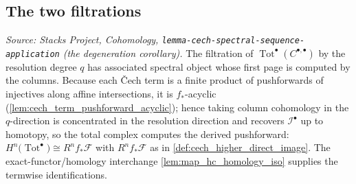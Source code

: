\subsection{The two filtrations}

\begin{lemma}
  \label{lem:total_complex_first_filtration_degenerates}
  \textit{Source: Stacks Project, Cohomology,
  \texttt{lemma-cech-spectral-sequence-application} (the degeneration corollary).}
  The filtration of \(\operatorname{Tot}^\bullet(C^{\bullet,\bullet})\) by the
  resolution degree \(q\) has associated spectral object whose first page is computed
  by the columns. Because each {\v C}ech term is a finite product of pushforwards of
  injectives along affine intersections, it is \(f_*\)-acyclic
  (\cref{lem:cech_term_pushforward_acyclic}); hence taking column cohomology in the
  \(q\)-direction is concentrated in the resolution direction and recovers
  \(\mathcal{I}^\bullet\) up to homotopy, so the total complex computes the derived
  pushforward: \(H^n\bigl(\operatorname{Tot}^\bullet\bigr) \cong R^n f_*\mathcal{F}\)
  with \(R^n f_*\mathcal{F}\) as in \cref{def:cech_higher_direct_image}. The
  exact-functor/homology interchange \cref{lem:map_hc_homology_iso} supplies the
  termwise identifications.
\end{lemma}


